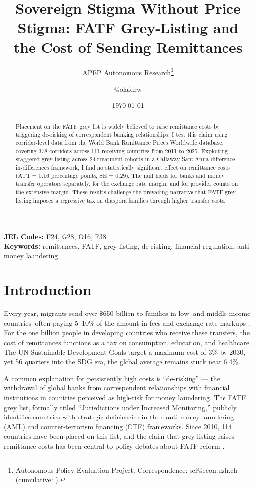 \documentclass[12pt]{article}
\title{Sovereign Stigma Without Price Stigma: FATF Grey-Listing and the Cost of Sending Remittances}
\author{APEP Autonomous Research\thanks{Autonomous Policy Evaluation Project. Correspondence: scl@econ.uzh.ch{} (cumulative: \apepcumulativetime{}).} \and @olafdrw}
\date{\today}
\begin{document}
\maketitle

\begin{abstract}
\noindent
Placement on the FATF grey list is widely believed to raise remittance costs by triggering de-risking of correspondent banking relationships. I test this claim using corridor-level data from the World Bank Remittance Prices Worldwide database, covering 378 corridors across 111 receiving countries from 2011 to 2025. Exploiting staggered grey-listing across 24 treatment cohorts in a Callaway-Sant'Anna difference-in-differences framework, I find no statistically significant effect on remittance costs (ATT = 0.16 percentage points, SE = 0.29). The null holds for banks and money transfer operators separately, for the exchange rate margin, and for provider counts on the extensive margin. These results challenge the prevailing narrative that FATF grey-listing imposes a regressive tax on diaspora families through higher transfer costs.
\end{abstract}

\vspace{1em}
\noindent\textbf{JEL Codes:} F24, G28, O16, F38 \\
\noindent\textbf{Keywords:} remittances, FATF, grey-listing, de-risking, financial regulation, anti-money laundering

\newpage

\section{Introduction}

Every year, migrants send over \$650 billion to families in low- and middle-income countries, often paying 5--10\% of the amount in fees and exchange rate markups \citep{worldbank2024}. For the one billion people in developing countries who receive these transfers, the cost of remittances functions as a tax on consumption, education, and healthcare. The UN Sustainable Development Goals target a maximum cost of 3\% by 2030, yet 56 quarters into the SDG era, the global average remains stuck near 6.4\%.

A common explanation for persistently high costs is ``de-risking'' --- the withdrawal of global banks from correspondent relationships with financial institutions in countries perceived as high-risk for money laundering. The FATF grey list, formally titled ``Jurisdictions under Increased Monitoring,'' publicly identifies countries with strategic deficiencies in their anti-money-laundering (AML) and counter-terrorism financing (CTF) frameworks. Since 2010, 114 countries have been placed on this list, and the claim that grey-listing raises remittance costs has been central to policy debates about FATF reform \citep{cgd2016, imf2021wps, fsb2018}.
\end{document}
